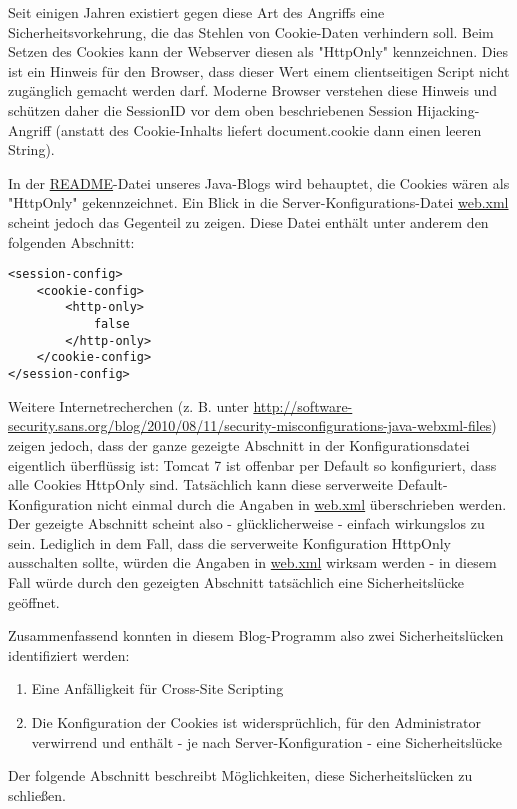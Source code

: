 Seit einigen Jahren existiert gegen diese Art des Angriffs eine Sicherheitsvorkehrung, die das Stehlen von Cookie-Daten verhindern soll. Beim Setzen des Cookies kann der Webserver diesen als "HttpOnly" kennzeichnen. Dies ist ein Hinweis für den Browser, dass dieser Wert einem clientseitigen Script nicht zugänglich gemacht werden darf. Moderne Browser verstehen diese Hinweis und schützen daher die SessionID vor dem oben beschriebenen Session Hijacking-Angriff (anstatt des Cookie-Inhalts liefert document.cookie dann einen leeren String).

In der \url{README}-Datei unseres Java-Blogs wird behauptet, die Cookies wären als "HttpOnly" gekennzeichnet. Ein Blick in die Server-Konfigurations-Datei \url{web.xml} scheint jedoch das Gegenteil zu zeigen. Diese Datei enthält unter anderem den folgenden Abschnitt:

\begin{lstlisting}
<session-config>
	<cookie-config>
		<http-only>
			false
		</http-only>
	</cookie-config>
</session-config>
\end{lstlisting}

Weitere Internetrecherchen (z. B. unter \url{http://software-security.sans.org/blog/2010/08/11/security-misconfigurations-java-webxml-files}) zeigen jedoch, dass der ganze gezeigte Abschnitt in der Konfigurationsdatei eigentlich überflüssig ist: Tomcat 7 ist offenbar per Default so konfiguriert, dass alle Cookies HttpOnly sind. Tatsächlich kann diese serverweite Default-Konfiguration nicht einmal durch die Angaben in \url{web.xml} überschrieben werden. Der gezeigte Abschnitt scheint also - glücklicherweise - einfach wirkungslos zu sein. Lediglich in dem Fall, dass die serverweite Konfiguration HttpOnly ausschalten sollte, würden die Angaben in \url{web.xml} wirksam werden - in diesem Fall würde durch den gezeigten Abschnitt tatsächlich eine Sicherheitslücke geöffnet.

Zusammenfassend konnten in diesem Blog-Programm also zwei Sicherheitslücken identifiziert werden:

\begin{enumerate}
\item Eine Anfälligkeit für Cross-Site Scripting
\item Die Konfiguration der Cookies ist widersprüchlich, für den Administrator verwirrend und enthält - je nach Server-Konfiguration - eine Sicherheitslücke
\end{enumerate}

Der folgende Abschnitt beschreibt Möglichkeiten, diese Sicherheitslücken zu schließen.

